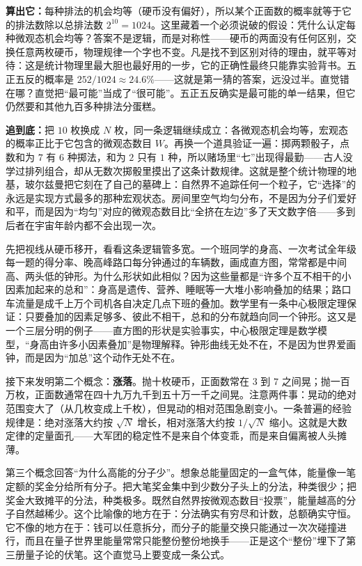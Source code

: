 \textbf{算出它：}每种排法的机会均等（硬币没有偏好），所以某个正面数的概率就等于它的排法数除以总排法数 \(2^{10}=1024\)。这里藏着一个必须说破的假设：凭什么认定每种微观态机会均等？答案不是逻辑，而是对称性——硬币的两面没有任何区别，交换任意两枚硬币，物理规律一个字也不变。凡是找不到区别对待的理由，就平等对待：这是统计物理里最大胆也最好用的一步，它的正确性最终只能靠实验背书。五正五反的概率是 \(252/1024\approx 24.6\%\)——这就是第一猜的答案，远没过半。直觉错在哪？直觉把“最可能”当成了“很可能”。五正五反确实是最可能的单一结果，但它仍然要和其他九百多种排法分蛋糕。

\textbf{追到底：}把 \(10\) 枚换成 \(N\) 枚，同一条逻辑继续成立：各微观态机会均等，宏观态的概率正比于它包含的微观态数目 \(W\)。再换一个道具验证一遍：掷两颗骰子，点数和为 \(7\) 有 \(6\) 种掷法，和为 \(2\) 只有 \(1\) 种，所以赌场里“七”出现得最勤——古人没学过排列组合，却从无数次掷骰里摸出了这条计数规律。这就是整个统计物理的地基，玻尔兹曼把它刻在了自己的墓碑上：自然界不追踪任何一个粒子，它“选择”的永远是实现方式最多的那种宏观状态。房间里空气均匀分布，不是因为分子们爱好和平，而是因为“均匀”对应的微观态数目比“全挤在左边”多了天文数字倍——多到后者在宇宙年龄内都不会出现一次。

先把视线从硬币移开，看看这条逻辑管多宽。一个班同学的身高、一次考试全年级每一题的得分率、晚高峰路口每分钟通过的车辆数，画成直方图，常常都是中间高、两头低的钟形。为什么形状如此相似？因为这些量都是“许多个互不相干的小因素加起来的总和”：身高是遗传、营养、睡眠等一大堆小影响叠加的结果；路口车流量是成千上万个司机各自决定几点下班的叠加。数学里有一条中心极限定理保证：只要叠加的因素足够多、彼此不相干，总和的分布就趋向同一个钟形。这又是一个三层分明的例子——直方图的形状是实验事实，中心极限定理是数学模型，“身高由许多小因素叠加”是物理解释。钟形曲线无处不在，不是因为世界爱画钟，而是因为“加总”这个动作无处不在。

接下来发明第二个概念：\textbf{涨落}。抛十枚硬币，正面数常在 \(3\) 到 \(7\) 之间晃；抛一百万枚，正面数通常在四十九万九千到五十万一千之间晃。注意两件事：晃动的绝对范围变大了（从几枚变成上千枚），但晃动的相对范围急剧变小。一条普遍的经验规律是：绝对涨落大约按 \(\sqrt{N}\) 增长，相对涨落大约按 \(1/\sqrt{N}\) 缩小。这就是大数定律的定量面孔——大军团的稳定性不是来自个体变乖，而是来自偏离被人头摊薄。

第三个概念回答“为什么高能的分子少”。想象总能量固定的一盒气体，能量像一笔定额的奖金分给所有分子。把大笔奖金集中到少数分子头上的分法，种类很少；把奖金大致摊平的分法，种类极多。既然自然界按微观态数目“投票”，能量越高的分子自然越稀少。这个比喻像的地方在于：分法确实有穷尽和计数，总额确实守恒。它不像的地方在于：钱可以任意拆分，而分子的能量交换只能通过一次次碰撞进行，而且在量子世界里能量常常只能整份整份地换手——正是这个“整份”埋下了第三册量子论的伏笔。这个直觉马上要变成一条公式。


